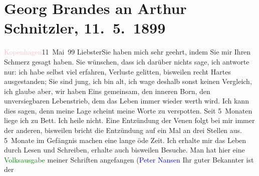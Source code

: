 

               \section[Georg Brandes an Arthur Schnitzler, 11. 5. 1899]{ Georg Brandes an Arthur Schnitzler, 11. 5. 1899}\nopagebreak{}\rehead{ }\normalsize\beginnumbering{} \toendnotes[C]{\smallbreak\pagebreak[2]} 
\toendnotes[C]{\smallbreak}\pstart
           \raggedleft{}{\pb}\textcolor{pink}{Kopenhagen}{}\ledrightnote{\textcolor{pink}{Kopenhagen}}{ }11 Mai 99\pend
           \pstart
           Liebster\hspace*{3.5em}Sie haben mich sehr geehrt, indem Sie mir
                    Ihren Schmerz gesagt haben. Sie wünschen, dass ich darüber nichts sage, ich
                    antworte  nur: ich habe selbst viel
                    erfahren, Verluste gelitten, bisweilen recht Hartes ausgestanden; Sie sind jung,
                    ich \introOben{}bin\introOben{} alt, ich wage
                    deshalb sonst keinen Vergleich, ich glaube aber, wir haben Eins gemeinsam, den inneren Born, den
                    unversiegbaren Lebenstrieb, dem das Leben immer wieder werth wird.\pend
           \pstart
           Ich kann dies sagen, denn meine Lage scheint meine Worte zu verspotten. Seit
                    5 Monaten liege ich zu Bett. Ich heile nicht. Eine Entzündung der Venen folgt
                    bei mir immer der anderen, bisweilen bricht die Entzündung auf ein Mal an drei
                    Stellen aus. 5 Monate im Gefängnis machen eine lange öde Zeit. Ich erhalte mir
                    das Leben {\pb}durch Lesen und
                    Schreiben, erhalte auch bisweilen Besuche. Man hat hier eine \textcolor{green}{Volksausgabe}{} meiner Schriften angefangen
                        (\textcolor{blue}{Peter Nansen}{}\ledrightnote{\textcolor{blue}{Peter Nansen}} Ihr guter Bekannter ist der
